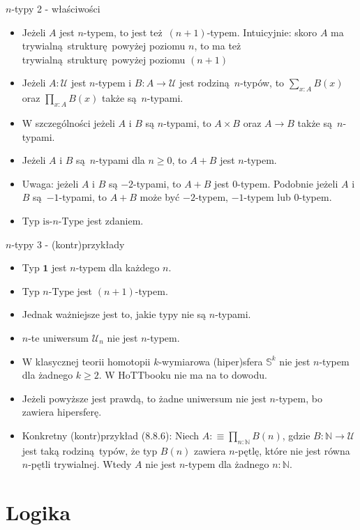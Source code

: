 \documentclass{beamer}
\newcommand{\defn}{:\equiv}
\newcommand{\U}{\mathcal{U}}
\begin{document}
\begin{frame}{$n$-typy 2 - właściwości}
\begin{itemize}
	\item Jeżeli $A$ jest $n$-typem, to jest też $(n + 1)$-typem. Intuicyjnie: skoro $A$ ma trywialną strukturę powyżej poziomu $n$, to ma też trywialną strukturę powyżej poziomu $(n + 1)$
	\item Jeżeli $A : \U$ jest $n$-typem i $B : A \to \U$ jest rodziną $n$-typów, to $\sum_{x : A} B(x)$ oraz $\prod_{x : A} B(x)$ także są $n$-typami.
	\item W szczególności jeżeli $A$ i $B$ są $n$-typami, to $A \times B$ oraz $A \to B$ także są $n$-typami.
	\item Jeżeli $A$ i $B$ są $n$-typami dla $n \geq 0$, to $A + B$ jest $n$-typem.
	\item Uwaga: jeżeli $A$ i $B$ są $-2$-typami, to $A + B$ jest $0$-typem. Podobnie jeżeli $A$ i $B$ są $-1$-typami, to $A + B$ może być $-2$-typem, $-1$-typem lub $0$-typem.
	\item Typ $\text{is-}n\text{-Type}$ jest zdaniem.
\end{itemize}
\end{frame}

\begin{frame}{$n$-typy 3 - (kontr)przykłady}
\begin{itemize}
	\item Typ $\mathbf{1}$ jest $n$-typem dla każdego $n$.
	\item Typ $n\text{-Type}$ jest $(n + 1)$-typem.
	\item Jednak ważniejsze jest to, jakie typy nie są $n$-typami.
	\item $n$-te uniwersum $\U_n$ nie jest $n$-typem.
	\item W klasycznej teorii homotopii $k$-wymiarowa (hiper)sfera $\mathbb{S}^k$ nie jest $n$-typem dla żadnego $k \geq 2$. W HoTTbooku nie ma na to dowodu.
	\item Jeżeli powyższe jest prawdą, to żadne uniwersum nie jest $n$-typem, bo zawiera hipersferę.
	\item Konkretny (kontr)przykład (8.8.6): Niech $A \defn \prod_{n : \mathbb{N}} B(n)$, gdzie $B : \mathbb{N} \to \U$ jest taką rodziną typów, że typ $B(n)$ zawiera $n$-pętlę, które nie jest równa $n$-pętli trywialnej. Wtedy $A$ nie jest $n$-typem dla żadnego $n : \mathbb{N}$.
\end{itemize}
\end{frame}

\section{Logika}
\end{document}

